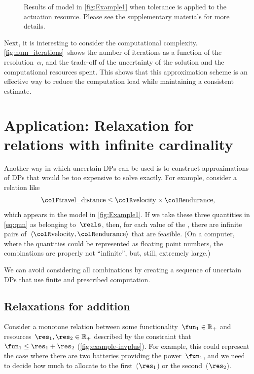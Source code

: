 \begin{figure}[h]
{    }

    \caption{Results of model in \cref{fig:Example1} when tolerance is applied
    to the actuation  resource. Please see the supplementary
    materials for more details.}
\end{figure}

Next, it is interesting to consider the computational complexity.
\cref{fig:num_iterations}~shows the number of iterations as
a function of the resolution~$\alpha$, and the trade-off of the
uncertainty of the solution and the computational resources spent.
This shows that this approximation scheme is an effective way to reduce
the computation load while maintaining a consistent estimate.


\section{Application: Relaxation for relations with infinite cardinality\label{sec:Application-relax}}

Another way in which uncertain DPs can be used is to construct approximations
of DPs that would be too expensive to solve exactly. For example,
consider a relation like
\begin{equation}
{\colF\text{travel\_distance}}
    \leq{\colR\text{velocity}}\times{\colR\text{endurance}},\label{eq:qun}
\end{equation}
which appears in the model in \cref{fig:Example1}. If we take
these three quantities in \cref{eq:qun} as belonging to~$\reals$,
then, for each value of the , there are infinite
pairs of~$\left\langle {\colR\text{velocity}},{\colR\text{endurance}}\right\rangle $
that are feasible. (On a computer, where the quantities could be represented
as floating point numbers, the combinations are properly not ``infinite'',
but, still, extremely large.)

We can avoid considering all combinations by creating a sequence of
uncertain DPs that use finite and prescribed computation.

\subsection{Relaxations for addition}

Consider a monotone relation between some functionality~$\fun_{1}\in\mathbb{R}_{+}$
and resources~$\res_{1},\res_{2}\in\mathbb{R}_{+}$ described by
the constraint that~$\fun_{1}\leq\res_{1}+\res_{2}$ (\cref{fig:example-invplus}).
For example, this could represent the case where there are two batteries
providing the power~$\fun_{1}$, and we need to decide how much to
allocate to the first~($\res_{1}$) or the second~($\res_{2}$).

